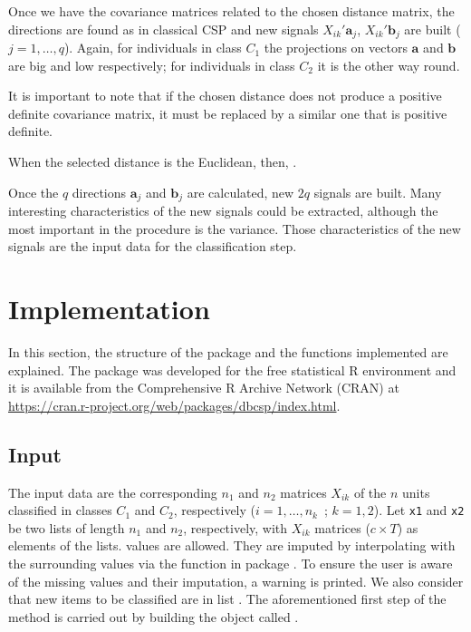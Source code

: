 Once we have the covariance matrices related to the chosen distance matrix, the directions are found as in classical CSP and new signals $X_{i k}'\mathbf{a}_j$, $X_{i k}'\mathbf{b}_j$ are built ($j=1, \ldots, q$). Again, for individuals in class $C_1$ the projections on vectors $\mathbf{a}$ and $\mathbf{b}$ are big and low respectively; for individuals in class $C_2$ it is the other way round.

\bigskip

It is important to note that if the chosen distance does not produce a positive definite covariance matrix, it must be replaced by a similar one that is positive definite.

\bigskip

When the selected distance is the Euclidean, then, .

Once the $q$ directions $\mathbf{a}_j$ and $\mathbf{b}_j$ are calculated, new $2q$ signals are built. Many interesting characteristics of the new signals could be extracted, although the most important in the procedure is the variance. Those characteristics of the new signals are the input data for the classification step.

\section{Implementation}
In this section, the structure of the package and the functions implemented are explained. The  package was developed for the free statistical R environment and it is  available from the Comprehensive R Archive Network (CRAN) at \url{https://cran.r-project.org/web/packages/dbcsp/index.html}.


\subsection{Input}
The input data are the corresponding $n_1$ and $n_2$ matrices $X_{i k}$  of the $n$ units classified in classes $C_1$ and $C_2$, respectively ($i=1, \ldots, n_k$\, ; \; $k=1, 2$).   Let {\tt x1} and {\tt x2} be  two lists of length $n_1$ and $n_2$, respectively, with $X_{i k}$  matrices ($c \times T$) as elements of the lists.   values are allowed. They are imputed by interpolating with the surrounding values via the  function in package . To ensure the user is aware of the missing values and their imputation, a warning is printed. We also consider that new items to be classified are in list .
The aforementioned first step of the method is carried out by building the object called .



